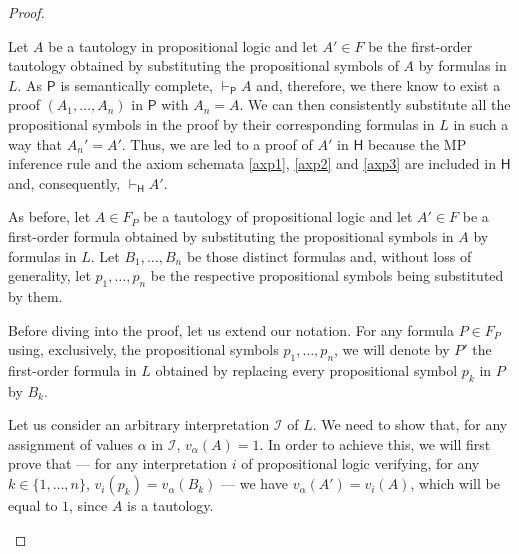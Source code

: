 \begin{proof}
\begin{parlist}
\item Let ${A}$ be a tautology in propositional logic and let $A'\in F$ be the first-order tautology obtained by substituting the propositional symbols of $A$ by formulas in $L$.
As $\mathsf{P}$ is semantically complete, $\vdash_{\mathsf{P}}{A}$ and, therefore, we there know to exist a proof $({A}_1,\ldots,{A}_n)$ in $\mathsf{P}$ with ${A}_n = {A}$.
We can then consistently substitute all the propositional symbols in the proof by their corresponding formulas in $L$ in such a way that $A_n' = A'$.
Thus, we are led to a proof of $A'$ in $\mathsf{H}$ because the MP inference rule and the axiom schemata \ref{axp1}, \ref{axp2} and \ref{axp3} are included in $\mathsf{H}$ and, consequently, $\vdash_{\mathsf{H}}{A'}$. 

\item As before, let $A \in F_P$ be a tautology of propositional logic and let $A' \in F$ be a first-order formula obtained by substituting the propositional symbols in $A$ by formulas in $L$.
Let $B_1,\ldots,B_n$ be those distinct formulas and, without loss of generality, let $p_1,\ldots,p_n$ be the respective propositional symbols being substituted by them.

Before diving into the proof, let us extend our notation. For any formula $P\in F_P$ using, exclusively, the propositional symbols $p_1,\ldots,p_n$, we will denote by $P'$ the first-order formula in $L$ obtained by replacing every propositional symbol $p_k$ in $P$ by $B_k$.

Let us consider an arbitrary interpretation $\mathcal{I}$ of $L$. We need to show that, for any assignment of values $\alpha$ in $\mathcal{I}$, $v_\alpha(A) = 1$. In order to achieve this, we will first prove that --- for any interpretation $i$ of propositional logic verifying, for any $k \in \{1,\ldots,n\}$, $v_i(p_k) = v_\alpha(B_k)$ --- we have $v_\alpha(A') = v_i(A)$, which will be equal to $1$, since $A$ is a tautology.


\end{parlist}
\end{proof}
